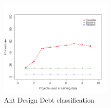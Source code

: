 
\clearpage

\begin{figure}[thb!]
  \centering
  \includegraphics[width=0.50\textwidth]{figures/design_ant.pdf}
  \vspace{-3mm}
  \caption{Ant Design Debt classification}
  \label{fig:design_ant}
\end{figure}

